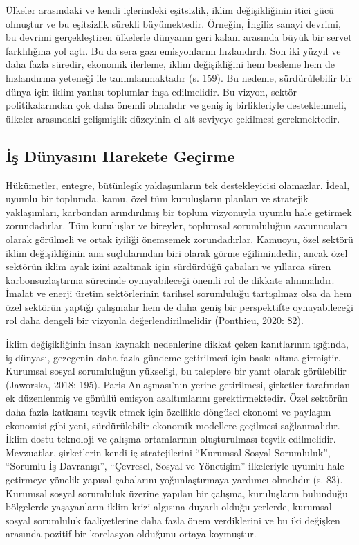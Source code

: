 \documentclass[
]{book}
\begin{document}
Ülkeler arasındaki ve kendi içlerindeki eşitsizlik, iklim değişikliğinin itici gücü olmuştur ve bu eşitsizlik sürekli büyümektedir. Örneğin, İngiliz sanayi devrimi, bu devrimi gerçekleştiren ülkelerle dünyanın geri kalanı arasında büyük bir servet farklılığına yol açtı. Bu da sera gazı emisyonlarını hızlandırdı. Son iki yüzyıl ve daha fazla süredir, ekonomik ilerleme, iklim değişikliğini hem besleme hem de hızlandırma yeteneği ile tanımlanmaktadır (s. 159). \citep{harvey2016climate} Bu nedenle, sürdürülebilir bir dünya için iklim yanlısı toplumlar inşa edilmelidir. Bu vizyon, sektör politikalarından çok daha önemli olmalıdır ve geniş iş birlikleriyle desteklenmeli, ülkeler arasındaki gelişmişlik düzeyinin el alt seviyeye çekilmesi gerekmektedir.

\hypertarget{iux15f-duxfcnyasux131nux131-harekete-geuxe7irme}{%
\subsection{İş Dünyasını Harekete Geçirme}\label{iux15f-duxfcnyasux131nux131-harekete-geuxe7irme}}

Hükümetler, entegre, bütünleşik yaklaşımların tek destekleyicisi olamazlar. İdeal, uyumlu bir toplumda, kamu, özel tüm kuruluşların planları ve stratejik yaklaşımları, karbondan arındırılmış bir toplum vizyonuyla uyumlu hale getirmek zorundadırlar. Tüm kuruluşlar ve bireyler, toplumsal sorumluluğun savunucuları olarak görülmeli ve ortak iyiliği önemsemek zorundadırlar. Kamuoyu, özel sektörü iklim değişikliğinin ana suçlularından biri olarak görme eğilimindedir, ancak özel sektörün iklim ayak izini azaltmak için sürdürdüğü çabaları ve yıllarca süren karbonsuzlaştırma sürecinde oynayabileceği önemli rol de dikkate alınmalıdır. İmalat ve enerji üretim sektörlerinin tarihsel sorumluluğu tartışılmaz olsa da hem özel sektörün yaptığı çalışmalar hem de daha geniş bir perspektifte oynayabileceği rol daha dengeli bir vizyonla değerlendirilmelidir (Ponthieu, 2020: 82).

İklim değişikliğinin insan kaynaklı nedenlerine dikkat çeken kanıtlarının ışığında, iş dünyası, gezegenin daha fazla gündeme getirilmesi için baskı altına girmiştir. Kurumsal sosyal sorumluluğun yükselişi, bu taleplere bir yanıt olarak görülebilir (Jaworska, 2018: 195). Paris Anlaşması'nın yerine getirilmesi, şirketler tarafından ek düzenlenmiş ve gönüllü emisyon azaltımlarını gerektirmektedir. Özel sektörün daha fazla katkısını teşvik etmek için özellikle döngüsel ekonomi ve paylaşım ekonomisi gibi yeni, sürdürülebilir ekonomik modellere geçilmesi sağlanmalıdır. İklim dostu teknoloji ve çalışma ortamlarının oluşturulması teşvik edilmelidir. Mevzuatlar, şirketlerin kendi iç stratejilerini ``Kurumsal Sosyal Sorumluluk'', ``Sorumlu İş Davranışı'', ``Çevresel, Sosyal ve Yönetişim'' ilkeleriyle uyumlu hale getirmeye yönelik yapısal çabalarını yoğunlaştırmaya yardımcı olmalıdır (s. 83). \citep{ponthieu2019climate} Kurumsal sosyal sorumluluk üzerine yapılan bir çalışma, kuruluşların bulunduğu bölgelerde yaşayanların iklim krizi algısına duyarlı olduğu yerlerde, kurumsal sosyal sorumluluk faaliyetlerine daha fazla önem verdiklerini ve bu iki değişken arasında pozitif bir korelasyon olduğunu ortaya koymuştur. \citep{huang2022climate}
\end{document}

